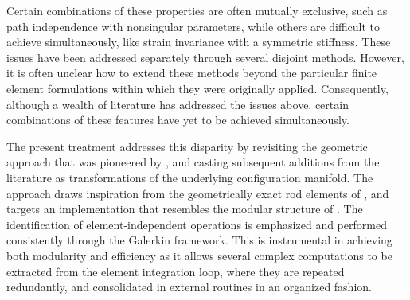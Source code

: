 %
Certain combinations of these properties are often mutually exclusive, such as path independence with nonsingular parameters, while others are difficult to achieve simultaneously, like strain invariance with a symmetric stiffness.
These issues have been addressed separately through several disjoint methods. However, it is often unclear how to extend these methods beyond the particular finite element formulations within which they were originally applied.
Consequently, although a wealth of literature has addressed the issues above, certain combinations of these features have yet to be achieved simultaneously. 

The present treatment addresses this disparity by revisiting the 
geometric approach that was pioneered by \cite{simo1986threedimensional,simo1990stressa},
and casting subsequent additions from the literature as transformations of the
underlying configuration manifold.
The approach draws inspiration from the geometrically exact rod elements of \cite{jelenić1998interpolation,jelenić1999geometrically}, and targets
an implementation that resembles the modular structure of \cite{scott2008software}.
The identification of element-independent operations is emphasized
and performed consistently through the Galerkin framework.
This is instrumental in achieving both modularity and efficiency as
it allows several complex computations to be extracted from
the element integration loop,
where they are repeated redundantly, and consolidated in external routines in an organized fashion.

